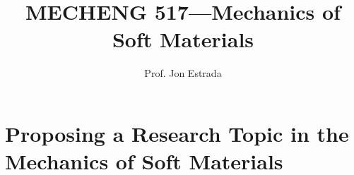\documentclass[preprint,12pt,authoryear]{elsarticle}
\begin{document}
\begin{frontmatter}

\title{MECHENG 517---Mechanics of Soft Materials} %

\author{Prof. Jon Estrada} 










\end{frontmatter}


\section*{Proposing a Research Topic in the Mechanics of Soft Materials}
\end{document}
